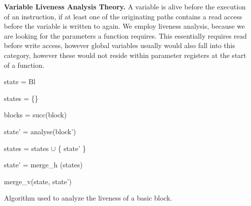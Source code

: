 \textbf{Variable Liveness Analysis Theory.}
\label{subsection:livenessanalysis}
A variable is alive before the execution of an instruction, if at least one of the originating paths contains a read access before the variable is written to again. We employ 
liveness analysis, because we are looking for the  parameters a function requires. This essentially requires read before write access, however global variables usually
would also fall into this category, however these would not reside within parameter registers at the start of a function.
%
%
%
\begin{algorithm}[h!]
	\SetAlgoLined
	{
 	state = Bl
 	

	states = \{\}
	
	blocks = succ(block)
	
	 {
	
 		state' = analyse(block')
 		
		states = states $\cup$ \{ state' \}
	}

	state' = merge\_h (states)

	\Return merge\_v(state, state')

	}
\caption{Algorithm used to analyze the liveness of a basic block.}
\label{alg:liveness}
\end{algorithm}

